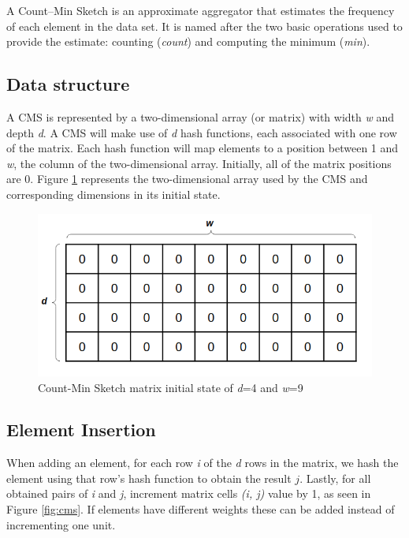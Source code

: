 A Count–Min Sketch \cite{Cormode-CMS} is an approximate aggregator that estimates the frequency of each element in the data set. It is named after the two basic operations used to provide the estimate: counting (\textit{count}) and computing the minimum (\textit{min}).

\subsection*{Data structure}
A CMS is represented by a two-dimensional array (or matrix) with width \textit{w} and depth \textit{d}. A CMS will make use of \textit{d} hash functions, each associated with one row of the matrix. Each hash function will map elements to a position between 1 and \textit{w}, the column of the two-dimensional array. Initially, all of the matrix positions are 0. Figure \ref{fig:initial-cms} represents the two-dimensional array used by the CMS and corresponding dimensions in its initial state. 

\begin{figure}[!htb]
    \begin{center}
      \includegraphics[scale=0.5]{figures/initial-cms.png}
      \caption[Count-Min Sketch initial state]{Count-Min Sketch matrix initial state of \textit{d}=4 and \textit{w}=9}
      \label{fig:initial-cms}
    \end{center}
\end{figure}

\subsection*{Element Insertion}
When adding an element, for each row \textit{i} of the \textit{d} rows in the matrix, we hash the element using that row's hash function to obtain the result $j$. Lastly, for all obtained pairs of \textit{i} and \textit{j}, increment matrix cells \textit{(i, j)} value by 1, as seen in Figure \ref{fig:cms}. If elements have different weights these can be added instead of incrementing one unit.

